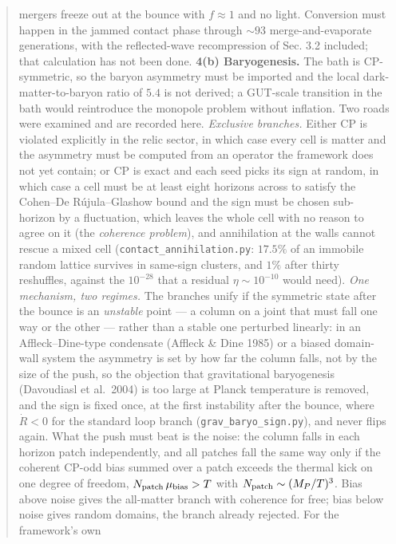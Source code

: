 \documentclass[
  11pt,
]{article}
\begin{document}
\begin{quote}
\begin{enumerate}
  mergers freeze out at the bounce with \(f \approx 1\) and no light.
  Conversion must happen in the jammed contact phase through
  \(\sim\!93\) merge-and-evaporate generations, with the reflected-wave
  recompression of Sec. 3.2 included; that calculation has not been
  done. \textbf{4(b) Baryogenesis.} The bath is CP-symmetric, so the
  baryon asymmetry must be imported and the local dark-matter-to-baryon
  ratio of \(5.4\) is not derived; a GUT-scale transition in the bath
  would reintroduce the monopole problem without inflation. Two roads
  were examined and are recorded here. \emph{Exclusive branches.} Either
  CP is violated explicitly in the relic sector, in which case every
  cell is matter and the asymmetry must be computed from an operator the
  framework does not yet contain; or CP is exact and each seed picks its
  sign at random, in which case a cell must be at least eight horizons
  across to satisfy the Cohen--De Rújula--Glashow bound and the sign
  must be chosen sub-horizon by a fluctuation, which leaves the whole
  cell with no reason to agree on it (the \emph{coherence problem}), and
  annihilation at the walls cannot rescue a mixed cell
  (\texttt{contact\_annihilation.py}: \(17.5\%\) of an immobile random
  lattice survives in same-sign clusters, and \(1\%\) after thirty
  reshuffles, against the \(10^{-28}\) that a residual
  \(\eta \sim 10^{-10}\) would need). \emph{One mechanism, two regimes.}
  The branches unify if the symmetric state after the bounce is an
  \emph{unstable} point --- a column on a joint that must fall one way
  or the other --- rather than a stable one perturbed linearly: in an
  Affleck--Dine-type condensate (Affleck \& Dine 1985) or a biased
  domain-wall system the asymmetry is set by how far the column falls,
  not by the size of the push, so the objection that gravitational
  baryogenesis (Davoudiasl et al.~2004) is too large at Planck
  temperature is removed, and the sign is fixed once, at the first
  instability after the bounce, where \(\dot R < 0\) for the standard
  loop branch (\texttt{grav\_baryo\_sign.py}), and never flips again.
  What the push must beat is the noise: the column falls in each horizon
  patch independently, and all patches fall the same way only if the
  coherent CP-odd bias summed over a patch exceeds the thermal kick on
  one degree of freedom, \(N_{\rm patch}\,\mu_{\rm bias} > T\) with
  \(N_{\rm patch} \sim (M_P/T)^3\). Bias above noise gives the
  all-matter branch with coherence for free; bias below noise gives
  random domains, the branch already rejected. For the framework's own

\end{enumerate}
\end{quote}
\end{document}

